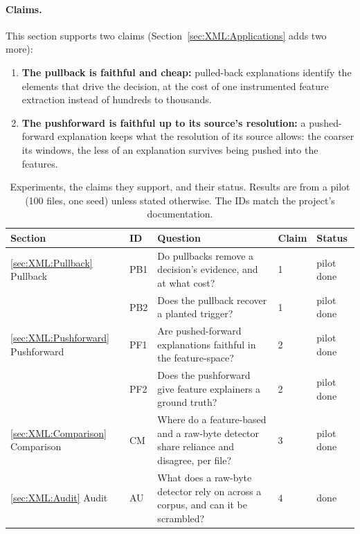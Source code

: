 
\paragraph{Claims.} This section supports two claims (Section~\ref{sec:XML:Applications} adds two more):
\begin{enumerate}[noitemsep, topsep=2pt]
    \item \textbf{The pullback is faithful and cheap:} pulled-back explanations identify the elements that drive the decision, at the cost of one instrumented feature extraction instead of hundreds to thousands.
    \item \textbf{The pushforward is faithful up to its source's resolution:} a pushed-forward explanation keeps what the resolution of its source allows: the coarser its windows, the less of an explanation survives being pushed into the features.
\end{enumerate}

\begin{table}[t]
  \centering
  \footnotesize
  \begin{tabular}{lllll}
    \toprule
    Section & ID & Question & Claim & Status \\
    \midrule
    \ref{sec:XML:Pullback} Pullback & PB1 & Do pullbacks remove a decision's evidence, and at what cost? & 1 & pilot done \\
     & PB2 & Does the pullback recover a planted trigger? & 1 & pilot done \\
    \ref{sec:XML:Pushforward} Pushforward & PF1 & Are pushed-forward explanations faithful in the feature-space? & 2 & pilot done \\
     & PF2 & Does the pushforward give feature explainers a ground truth? & 2 & pilot done \\
    \ref{sec:XML:Comparison} Comparison & CM & Where do a feature-based and a raw-byte detector share reliance and disagree, per file? & 3 & pilot done \\
    \ref{sec:XML:Audit} Audit & AU & What does a raw-byte detector rely on across a corpus, and can it be scrambled? & 4 & done \\
    \bottomrule
  \end{tabular}
  \caption{Experiments, the claims they support, and their status. Results are from a pilot (100 files, one seed) unless stated otherwise. The IDs match the project's documentation.}
  \label{tab:XML:Experiments}
\end{table}


